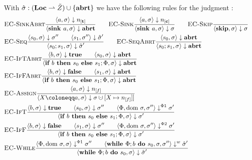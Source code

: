 With $\hat{\sigma}{}: (\textbf{Loc} \rightharpoonup \tilde{Z}) \cup \{\textbf{abrt}\}$ we have the following rules for the
 judgment :
\begin{align*}
    &\bsrule{EC-SinkAbrt}{\bigstep{a}{\store}{\tracked{}}}
    {\bigstep{\defaultsink}{\store}{\exception}} \qquad
    \bsrule{EC-Sink}{\bigstep{a}{\store}{\clean{}}}
    {\bigstep{\defaultsink}{\store}{\store}} \qquad
    \bsrule{EC-Skip}{}{\bigstep{\skipcmd}{\store}{\store}}\\
    &\bsrule{EC-Seq}{\bigstep{s_0}{\sigma}{\store''} \qquad \bigstep{s_1}{\store''}{\excstore'}}
    {\bigstep{\defaultssaseq}{\store}{\excstore'}}\qquad
    \bsrule{EC-SeqAbrt}{\bigstep{s_0}{\sigma}{\exception}}
    {\bigstep{\defaultssaseq}{\store}{\exception}} \\
    &\bsrule{EC-IfTAbrt}{\bigstep{b}{\store}{\btrue}\qquad \bigstep{s_0}{\store}{\exception}}
    {\bigstep{\defaultssaif}{\store}{\exception}}\\
    &\bsrule{EC-IfFAbrt}{\bigstep{b}{\store}{\bfalse}\qquad \bigstep{s_1}{\store}{\exception}}
    {\bigstep{\defaultssaif}{\store}{\exception}}\\
    &\bsrule{EC-Assign}{\bigstep{a}{\store}{\flagged{}}}
    {\bigstep{\defaultstore}{\store}{\storeassign{\store}{X \mapsto \flagged{}]}}}\\
    &\bsrule{EC-IfT}{\bigstep{b}{\store}{\btrue}\qquad \bigstep{s_0}{\store}{\store''}
    \qquad \bigsteppl{\philist}{\dom\store}{\store''}{\store'}}
    {\bigstep{\defaultssaif}{\store}{\store'}}\\
    &\bsrule{EC-IfF}{\bigstep{b}{\store}{\bfalse}\qquad \bigstep{s_1}{\store}{\store''}
    \qquad \bigsteppr{\philist}{\dom\store}{\store''}{\store'}}
    {\bigstep{\defaultssaif}{\store}{\store'}}\\
    &\bsrule{EC-While}{\bigsteppl{\philist}{\dom\store}{\store}{\store''} \qquad
    \bigstepw{\defaultssawhile}{\store}{\store''}{\excstore'}}
    {\bigstep{\defaultssawhile}{\store}{\excstore'}}\\
\end{align*}

